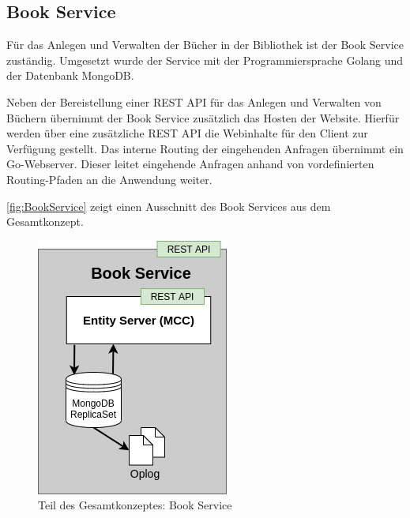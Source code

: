 \subsection{Book Service\label{sec5.2.1:Unterunterpunkt-1}}

Für das Anlegen und Verwalten der Bücher in der Bibliothek ist der Book Service zuständig. Umgesetzt wurde der Service mit der Programmiersprache Golang und der Datenbank MongoDB.

Neben der Bereistellung einer REST API für das Anlegen und Verwalten von Büchern übernimmt der Book Service zusätzlich das Hosten der Website. Hierfür werden über eine zusätzliche REST API die Webinhalte für den Client zur Verfügung gestellt.
Das interne Routing der eingehenden Anfragen übernimmt ein Go-Webserver. Dieser leitet eingehende Anfragen anhand von vordefinierten Routing-Pfaden an die Anwendung weiter.

\autoref{fig:BookService} zeigt einen Ausschnitt des Book Services aus dem Gesamtkonzept.

\begin{figure}[H]
    \centering
    \includegraphics[width=0.9\linewidth]{images/BookService.png}
    \caption{Teil des Gesamtkonzeptes: Book Service}
    \label{fig:BookService}
\end{figure}

